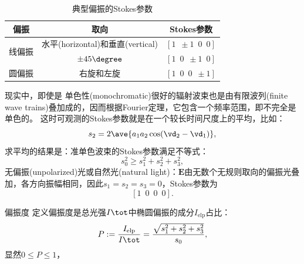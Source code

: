 \begin{table}[h]
    \centering
    \caption{典型偏振的Stokes参数}
    \begin{tabular}{ccc}
        \toprule
        偏振 & 取向 & Stokes参数\\
        \midrule
        \multirow{2}{*}{线偏振} & 水平(horizontal)和垂直(vertical) & $[1\enspace\pm1\enspace0\enspace0]$ \\
         & $\pm 45\degree$ & $[1\enspace0\enspace\pm1\enspace0]$ \\
        圆偏振 & 右旋和左旋 & $[1\enspace0\enspace0\enspace\pm1]$ \\
        \bottomrule
    \end{tabular}
    \label{tab:Stokes parameters}
\end{table}

现实中，即使是%
单色性(monochromatic)很好的辐射波束也是由有限波列(finite wave trains)叠加成的，因而根据Fourier定理，它包含一个频率范围，即不完全是单色的。%
这时可观测的Stokes参数就是在一个较长时间尺度上的平均，比如：
\[
    s_2=2\ave{a_1a_2\cos(\vd_2-\vd_1)},
\]
求平均的结果是：准单色波束的Stokes参数满足不等式：
\[
    s_0^2\geqslant s_1^2+s_2^2+s_3^2,
\]
无偏振(unpolarized)光或自然光(natural light)：$\bm E$由无数个无规则取向的偏振光叠加，各方向振幅相同，因此$s_1=s_2=s_3=0$，Stokes参数为
\[
    [1\enspace0\enspace0\enspace0].
\]

\begin{definition}{偏振度}{}
    定义偏振度是总光强$I\tot$中椭圆偏振的成分$I_\text{elp}$占比：
    \[
        P:=\frac{I_\text{elp}}{I\tot}=\frac{\sqrt{s_1^2+s_2^2+s_3^2}}{s_0},
    \]
    显然$0\leqslant P\leqslant 1$，
\end{definition}

